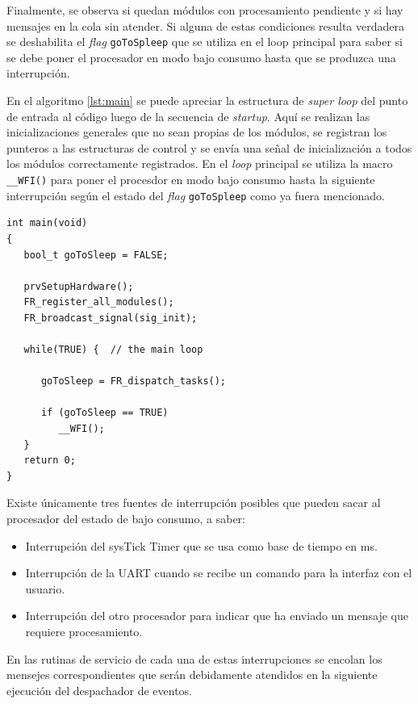 Finalmente, se observa si quedan módulos con procesamiento pendiente y si hay mensajes en la cola sin atender.  Si alguna de estas condiciones resulta verdadera se deshabilita el \textit{flag} \texttt{goToSpleep} que se utiliza en el loop principal para saber si se debe poner el procesador en modo bajo consumo hasta que se produzca una interrupción.

En el algoritmo \ref{lst:main} se puede apreciar la estructura de \textit{super loop} del punto de entrada al código luego de la secuencia de \textit{startup}.  Aquí se realizan las inicializaciones generales que no sean propias de los módulos, se registran los punteros a las estructuras de control y se envía una señal de inicialización a todos los módulos correctamente registrados.  En el \textit{loop} principal se utiliza la macro \texttt{\_\_WFI()} para poner el procesdor en modo bajo consumo hasta la siguiente interrupción según el estado del \textit{flag} \texttt{goToSpleep} como ya fuera mencionado.

\vspace{10px}%
\begin{lstlisting}[caption={Función principal main().},label={lst:main}]
int main(void)
{
   bool_t goToSleep = FALSE;

   prvSetupHardware();
   FR_register_all_modules();
   FR_broadcast_signal(sig_init);

   while(TRUE) {  // the main loop

      goToSleep = FR_dispatch_tasks();

      if (goToSleep == TRUE)
         __WFI();
   }
   return 0;
}
\end{lstlisting}

Existe únicamente tres fuentes de interrupción posibles que pueden sacar al procesador del estado de bajo consumo, a saber:

\begin{itemize}
	\item Interrupción del sysTick Timer que se usa como base de tiempo en ms.
	\item Interrupción de la UART cuando se recibe un comando para la interfaz con el usuario.
	\item Interrupción del otro procesador para indicar que ha enviado un mensaje que requiere procesamiento.
\end{itemize}

En las rutinas de servicio de cada una de estas interrupciones se encolan los mensejes correspondientes que serán debidamente atendidos en la siguiente ejecución del despachador de eventos.

